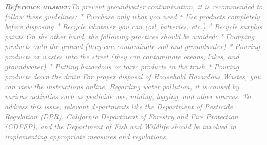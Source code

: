 \documentclass[a4paper,11pt]{article}
\begin{document}
\begin{refanswerenv}
{\footnotesize\textit{\textcolor{gray}{\textbf{Reference answer:}\enspace To prevent groundwater contamination, it is recommended to follow these guidelines:
* Purchase only what you need
* Use products completely before disposing
* Recycle whatever you can (oil, batteries, etc.)
* Recycle surplus paints
On the other hand, the following practices should be avoided:
* Dumping products onto the ground (they can contaminate soil and groundwater)
* Pouring products or wastes into the street (they can contaminate oceans, lakes, and groundwater)
* Putting hazardous or toxic products in the trash
* Pouring products down the drain
For proper disposal of Household Hazardous Wastes, you can view the instructions online.
Regarding water pollution, it is caused by various activities such as pesticide use, mining, logging, and other sources. To address this issue, relevant departments like the Department of Pesticide Regulation (DPR), California Department of Forestry and Fire Protection (CDFFP), and the Department of Fish and Wildlife should be involved in implementing appropriate measures and regulations.}}}
\end{refanswerenv}
\end{document}
